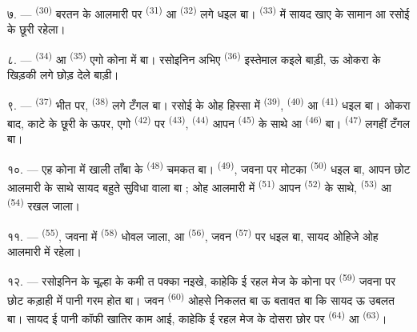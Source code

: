 ७. ---  \textsuperscript{(30)} बरतन के आलमारी पर
 \textsuperscript{(31)} आ 
\textsuperscript{(32)} लगे धइल बा।  \textsuperscript{(33)}
में सायद खाए के सामान आ रसोई के छूरी रहेला।

८. ---  \textsuperscript{(34)} आ 
\textsuperscript{(35)} एगो कोना में बा। रसोइनिन अभिए  \textsuperscript{(36)} इस्तेमाल कइले बाड़ी, ऊ ओकरा के खिड़की लगे
छोड़ देले बाड़ी।

९. ---  \textsuperscript{(37)} भीत पर,
 \textsuperscript{(38)} लगे टँगल बा। रसोई के ओह हिस्सा में
 \textsuperscript{(39)}, 
\textsuperscript{(40)} आ  \textsuperscript{(41)} धइल
बा। ओकरा बाद, काटे के छूरी के ऊपर, एगो  \textsuperscript{(42)}
पर  \textsuperscript{(43)},  \textsuperscript{(44)}
आपन  \textsuperscript{(45)} के साथे आ 
\textsuperscript{(46)} बा।  \textsuperscript{(47)} लगहीं टँगल
बा।

१०. --- एह कोना में खाली ताँबा के  \textsuperscript{(48)}
चमकत बा।  \textsuperscript{(49)}, जवना पर मोटका
 \textsuperscript{(50)} धइल बा, आपन छोट आलमारी के साथे सायद
बहुते सुविधा वाला बा ; ओह आलमारी में 
\textsuperscript{(51)} आपन  \textsuperscript{(52)} के साथे,
 \textsuperscript{(53)} आ 
\textsuperscript{(54)} रखल जाला।

\VUsaut{4.0mm}
\VUsaut{3.0mm}

११. ---  \textsuperscript{(55)}, जवना में 
\textsuperscript{(58)} धोवल जाला, आ 
\textsuperscript{(56)}, जवन  \textsuperscript{(57)} पर
धइल बा, सायद ओहिजे ओह आलमारी में रहेला।

१२. --- रसोइनिन के चूल्हा के कमी त पक्का नइखे, काहेकि ई रहल मेज के
कोना पर  \textsuperscript{(59)} जवना पर छोट कड़ाही
में पानी गरम होत बा। जवन  \textsuperscript{(60)} ओहसे निकलत
बा ऊ बतावत बा कि सायद ऊ उबलत बा। सायद ई पानी कॉफी खातिर काम आई, काहेकि
ई रहल मेज के दोसरा छोर पर  \textsuperscript{(64)}
आ  \textsuperscript{(63)}।

